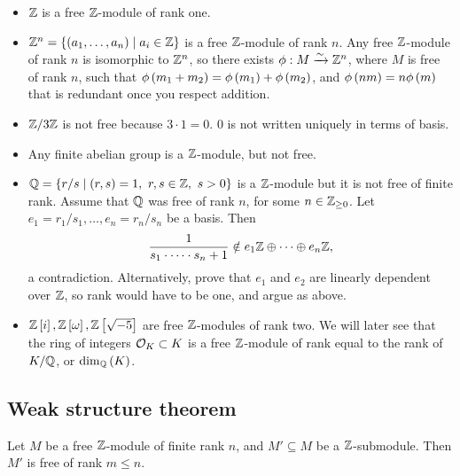 \begin{example*}
\hfill
\begin{itemize}
\item $ \mathbb{Z} $ is a free $ \mathbb{Z} $-module of rank one.
\item $ \mathbb{Z}^n = \left\{ \left( a_1, \dots, a_n \right) \mid a_i \in \mathbb{Z} \right\} $ is a free $ \mathbb{Z} $-module of rank $ n $. Any free $ \mathbb{Z} $-module of rank $ n $ is isomorphic to $ \mathbb{Z}^n $, so there exists $ \phi : M \xrightarrow{\sim} \mathbb{Z}^n $, where $ M $ is free of rank $ n $, such that $ \phi\left( m_1 + m_2 \right) = \phi\left( m_1 \right) + \phi\left( m_2 \right) $, and $ \phi\left( nm \right) = n\phi\left( m \right) $ that is redundant once you respect addition.
\item $ \mathbb{Z} / 3\mathbb{Z} $ is not free because $ 3 \cdot 1 = 0 $. $ 0 $ is not written uniquely in terms of basis.
\item Any finite abelian group is a $ \mathbb{Z} $-module, but not free.
\item $ \Q = \cb{r / s \mid \rb{r, s} = 1, \ r, s \in \Z, \ s > 0} $ is a $ \mathbb{Z} $-module but it is not free of finite rank. Assume that $ \mathbb{Q} $ was free of rank $ n $, for some $ n \in \mathbb{Z}_{\ge 0} $. Let $ e_1 = r_1 / s_1, \dots, e_n = r_n / s_n $ be a basis. Then
$$ \dfrac{1}{s_1 \cdot \dots \cdot s_n + 1} \notin e_1\mathbb{Z} \oplus \dots \oplus e_n\mathbb{Z}, $$
a contradiction. Alternatively, prove that $ e_1 $ and $ e_2 $ are linearly dependent over $ \mathbb{Z} $, so rank would have to be one, and argue as above.
\item $ \mathbb{Z}\left[ i \right], \mathbb{Z}\left[ \omega \right], \mathbb{Z}\left[ \sqrt{-5} \right] $ are free $ \mathbb{Z} $-modules of rank two. We will later see that the ring of integers $ \mathcal{O}_K \subset K $ is a free $ \mathbb{Z} $-module of rank equal to the rank of $ K / \mathbb{Q} $, or $ \dim_{\mathbb{Q}}\left( K \right) $.
\end{itemize}
\end{example*}

\pagebreak

\subsection{Weak structure theorem}

\begin{theorem}
Let $ M $ be a free $ \mathbb{Z} $-module of finite rank $ n $, and $ M' \subseteq M $ be a $ \mathbb{Z} $-submodule. Then $ M' $ is free of rank $ m \le n $.
\end{theorem}

